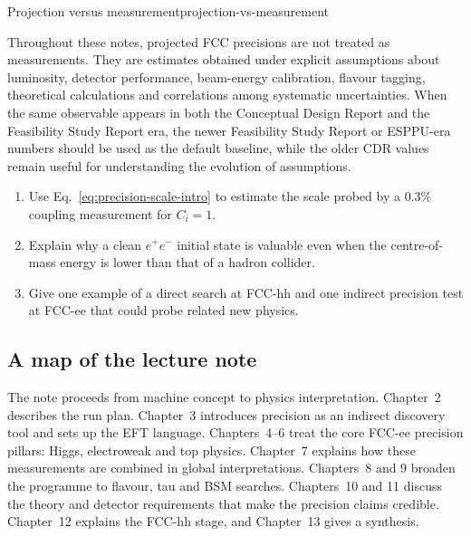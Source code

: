 \documentclass[11pt,a4paper]{article}
\numberwithin{equation}{section}
\begin{document}
\begin{remarkbox}{Projection versus measurement}{projection-vs-measurement}

Throughout these notes, projected FCC precisions are not treated as measurements. They are estimates obtained under explicit assumptions about luminosity, detector performance, beam-energy calibration, flavour tagging, theoretical calculations and correlations among systematic uncertainties. When the same observable appears in both the Conceptual Design Report and the Feasibility Study Report era, the newer Feasibility Study Report or ESPPU-era numbers should be used as the default baseline, while the older CDR values remain useful for understanding the evolution of assumptions.

\end{remarkbox}

\begin{guidedchecksbox}
\begin{enumerate}[leftmargin=1.6em]
\item Use Eq.~\eqref{eq:precision-scale-intro} to estimate the scale probed by a \(0.3\%\) coupling measurement for \(C_i=1\).
\item Explain why a clean \(e^+e^-\) initial state is valuable even when the centre-of-mass energy is lower than that of a hadron collider.
\item Give one example of a direct search at FCC-hh and one indirect precision test at FCC-ee that could probe related new physics.
\end{enumerate}
\end{guidedchecksbox}

\subsection{A map of the lecture note}
The note proceeds from machine concept to physics interpretation. Chapter~2 describes the run plan. Chapter~3 introduces precision as an indirect discovery tool and sets up the EFT language. Chapters~4--6 treat the core FCC-ee precision pillars: Higgs, electroweak and top physics. Chapter~7 explains how these measurements are combined in global interpretations. Chapters~8 and 9 broaden the programme to flavour, tau and BSM searches. Chapters~10 and 11 discuss the theory and detector requirements that make the precision claims credible. Chapter~12 explains the FCC-hh stage, and Chapter~13 gives a synthesis.
\end{document}
